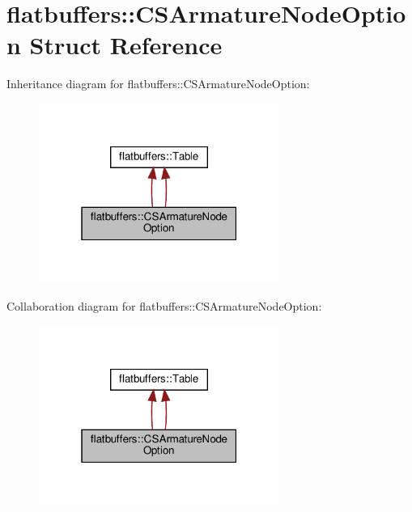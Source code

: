 \hypertarget{structflatbuffers_1_1CSArmatureNodeOption}{}\section{flatbuffers\+:\+:C\+S\+Armature\+Node\+Option Struct Reference}
\label{structflatbuffers_1_1CSArmatureNodeOption}


Inheritance diagram for flatbuffers\+:\+:C\+S\+Armature\+Node\+Option\+:
\nopagebreak
\begin{figure}[H]
\begin{center}
\leavevmode
\includegraphics[width=223pt]{structflatbuffers_1_1CSArmatureNodeOption__inherit__graph}
\end{center}
\end{figure}


Collaboration diagram for flatbuffers\+:\+:C\+S\+Armature\+Node\+Option\+:
\nopagebreak
\begin{figure}[H]
\begin{center}
\leavevmode
\includegraphics[width=223pt]{structflatbuffers_1_1CSArmatureNodeOption__coll__graph}
\end{center}
\end{figure}
